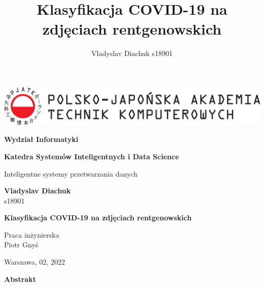 \documentclass{article}
\title{Klasyfikacja COVID-19 na zdjęciach rentgenowskich}
\author{Vladyslav Diachuk s18901}
\begin{document}
\begin{titlepage}          
	\sffamily                                                                              
	\includegraphics[width=\textwidth]{pjwstk_logo}

	\vspace{1.4cm}
	
	\begin{center}
		{
			\Large
			\textbf{Wydział Informatyki}
			\vspace{1.4cm}
			
			\textbf{Katedra Systemów Inteligentnych i Data Science}
			\vspace{0.5cm}
			
			Inteligentne systemy przetwarzania danych
			\vspace{1.4cm}
			
			\textbf{Vladyslav Diachuk}\\
			s18901
		}
		\vspace{1.2cm}
		
		{\huge\textbf{Klasyfikacja COVID-19 na zdjęciach rentgenowskich}}
	\end{center}
	\vspace{2cm}
	
	\begin{flushright}
		\Large
		Praca inżynierska\\	
		\vspace{0.4cm}	
		Piotr Gnyś
	\end{flushright}
	\vspace{3cm}
	
	\begin{center}
		\Large
		Warszawa, 02, 2022
	\end{center}
	
\end{titlepage}

\begin{flushleft}
	\Large 
	\textbf{Abstrakt}\\
\end{flushleft}
\end{document}

